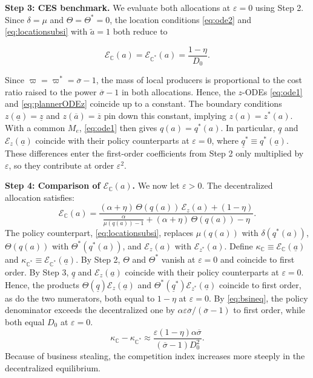 \noindent \textbf{Step 3: CES benchmark.} We evaluate both allocations at $\varepsilon = 0$ using Step 2. Since $\delta = \mu$ and $\Theta = \Theta^* = 0$, the location conditions \eqref{eq:ode2} and \eqref{eq:locationsubsi} with $\widetilde{a} = 1$ both reduce to

\begin{equation*}
\mathcal{E}_{\mathbb{C}}(a) = \mathcal{E}_{\mathbb{C}^*}(a) = \frac{1-\eta}{D_0}.
\end{equation*}

Since $\varpi = \varpi^* = \overline{\sigma} - 1$, the mass of local producers is proportional to the cost ratio raised to the power $\overline{\sigma} - 1$ in both allocations. Hence, the $z$-ODEs \eqref{eq:ode1} and \eqref{eq:plannerODEz} coincide up to a constant. The boundary conditions $z(\underline{a}) = \underline{z}$ and $z(\overline{a}) = \overline{z}$ pin down this constant, implying $z(a) = z^*(a)$. With a common $M_e$, \eqref{eq:ode1} then gives $q(a) = q^*(a)$. In particular, $\underline q$ and $\mathcal E_z(\underline a)$ coincide with their policy counterparts at $\varepsilon = 0$, where $\underline{q}^* \equiv q^*(\underline a)$. These differences enter the first-order coefficients from Step 2 only multiplied by $\varepsilon$, so they contribute at order $\varepsilon^2$.

\noindent \textbf{Step 4: Comparison of $\mathcal{E}_\mathbb{C}(a)$.} We now let $\varepsilon > 0$. The decentralized allocation satisfies:
%
\begin{equation*}
    \mathcal{E}_\mathbb{C}(a) = \frac{(\alpha + \eta) \, \Theta(q(a)) \, \mathcal{E}_z(a) + (1 - \eta)}{\frac{\alpha}{\mu(q(a)) - 1} + (\alpha + \eta) \, \Theta(q(a)) - \eta}.
\end{equation*}
%
The policy counterpart, \eqref{eq:locationsubsi}, replaces $\mu(q(a))$ with $\delta(q^*(a))$, $\Theta(q(a))$ with $\Theta^*(q^*(a))$, and $\mathcal{E}_z(a)$ with $\mathcal{E}_{z^*}(a)$. Define $\kappa_{\mathbb{C}} \equiv \mathcal{E}_\mathbb{C}(\underline{a})$ and $\kappa_{\mathbb{C}^*} \equiv \mathcal{E}_{\mathbb{C}^*}(\underline{a})$. By Step 2, $\Theta$ and $\Theta^*$ vanish at $\varepsilon=0$ and coincide to first order. By Step 3, $\underline{q}$ and $\mathcal{E}_z(\underline{a})$ coincide with their policy counterparts at $\varepsilon=0$. Hence, the products $\Theta(\underline{q})\mathcal{E}_z(\underline{a})$ and $\Theta^*(\underline{q}^*)\mathcal{E}_{z^*}(\underline{a})$ coincide to first order, as do the two numerators, both equal to $1-\eta$ at $\varepsilon=0$. By \eqref{eq:bsineq}, the policy denominator exceeds the decentralized one by $\alpha\varepsilon\overline{\sigma}/(\overline{\sigma}-1)$ to first order, while both equal $D_0$ at $\varepsilon=0$.
%
\begin{equation}\label{eq:kappaineq}
    \kappa_{\mathbb{C}} - \kappa_{\mathbb{C}^*} \approx \frac{\varepsilon (1-\eta) \alpha \overline{\sigma}}{(\overline{\sigma} - 1) D_0^2}.
\end{equation}
%
Because of business stealing, the competition index increases more steeply in the decentralized equilibrium.

